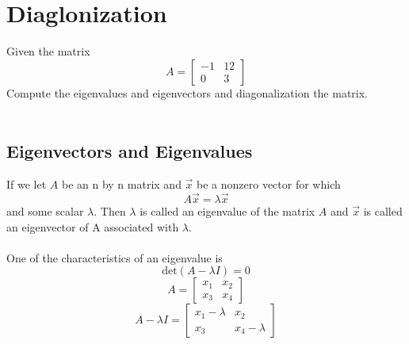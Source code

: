 \documentclass[12pt]{article}
\begin{document}
\section{Diaglonization}
Given the matrix
\begin{equation*}A = \begin{bmatrix}-1 & 12 \\ 0 & 3\end{bmatrix}\end{equation*}
Compute the eigenvalues and eigenvectors and diagonalization the matrix.\\\\
\subsection{Eigenvectors and Eigenvalues}
If we let $A$ be an n by n matrix and $\vec{x}$ be a nonzero vector for which 
\begin{equation*}A\vec{x} = \lambda\vec{ x}\end{equation*}
and some scalar $\lambda$. Then $\lambda$ is called an eigenvalue of the matrix $A$ and $\vec{x}$ is called an eigenvector of A associated with $\lambda$.
\\\\ One of the characteristics of an eigenvalue is
\begin{equation*}\text{det}(A-\lambda I) = 0\end{equation*}
\begin{equation*}A = \begin{bmatrix}x_1 & x_2 \\ x_3 & x_4\end{bmatrix}\end{equation*}
\begin{equation*}A - \lambda I= \begin{bmatrix}x_1-\lambda & x_2 \\ x_3 & x_4-\lambda\end{bmatrix}\end{equation*}
\end{document}
